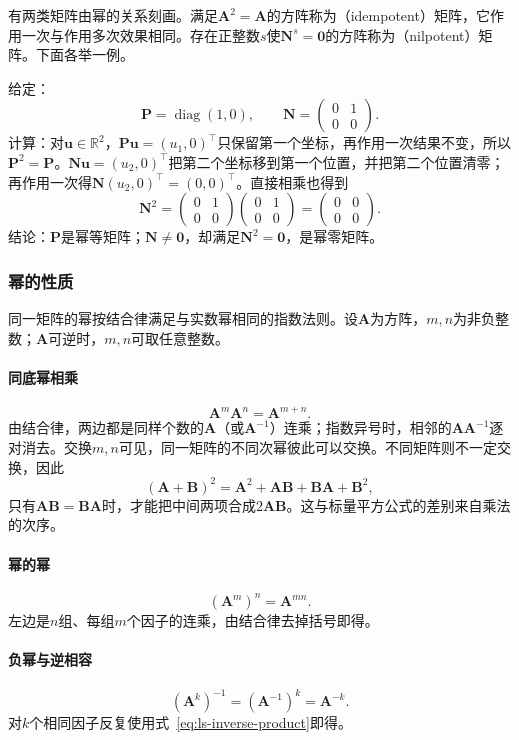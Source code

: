 有两类矩阵由幂的关系刻画。满足$\bm A^2=\bm A$的方阵称为（idempotent）矩阵，它作用一次与作用多次效果相同。存在正整数$s$使$\bm N^s=\bm0$的方阵称为（nilpotent）矩阵。下面各举一例。
\begin{example}[幂等矩阵与幂零矩阵]
\label{ex:ls-idempotent-nilpotent}
给定：
\[
\bm P=\operatorname{diag}(1,0),\qquad
\bm N=\begin{pmatrix}0&1\\0&0\end{pmatrix}.
\]
计算：对$\bm u\in\mathbb R^2$，$\bm P\bm u=(u_1,0)^\top$只保留第一个坐标，再作用一次结果不变，所以$\bm P^2=\bm P$。$\bm N\bm u=(u_2,0)^\top$把第二个坐标移到第一个位置，并把第二个位置清零；再作用一次得$\bm N(u_2,0)^\top=(0,0)^\top$。直接相乘也得到
\[
 \bm N^2=\begin{pmatrix}0&1\\0&0\end{pmatrix}\begin{pmatrix}0&1\\0&0\end{pmatrix}=\begin{pmatrix}0&0\\0&0\end{pmatrix}.
\]
结论：$\bm P$是幂等矩阵；$\bm N\neq\bm0$，却满足$\bm N^2=\bm0$，是幂零矩阵。
\end{example}

\subsubsection{幂的性质}
同一矩阵的幂按结合律满足与实数幂相同的指数法则。设$\bm A$为方阵，$m,n$为非负整数；$\bm A$可逆时，$m,n$可取任意整数。

\paragraph{同底幂相乘}
\[
 \bm A^m\bm A^n=\bm A^{m+n}.
\]
由结合律，两边都是同样个数的$\bm A$（或$\bm A^{-1}$）连乘；指数异号时，相邻的$\bm A\bm A^{-1}$逐对消去。交换$m,n$可见，同一矩阵的不同次幂彼此可以交换。不同矩阵则不一定交换，因此
\[
 (\bm A+\bm B)^2=\bm A^2+\bm A\bm B+\bm B\bm A+\bm B^2,
\]
只有$\bm A\bm B=\bm B\bm A$时，才能把中间两项合成$2\bm A\bm B$。这与标量平方公式的差别来自乘法的次序。

\paragraph{幂的幂}
\[
 (\bm A^m)^n=\bm A^{mn}.
\]
左边是$n$组、每组$m$个因子的连乘，由结合律去掉括号即得。

\paragraph{负幂与逆相容}
\[
 (\bm A^k)^{-1}=(\bm A^{-1})^k=\bm A^{-k}.
\]
对$k$个相同因子反复使用式~\eqref{eq:ls-inverse-product}即得。
